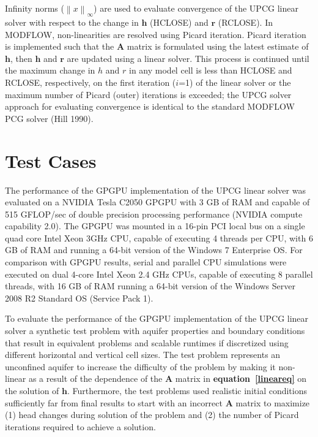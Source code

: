 \documentclass[12pt]{article}
\begin{document}
Infinity norms ($\left \|  x \right \|_{\infty}$) are used to evaluate convergence of the UPCG linear solver with respect to the change in $\mathbf{h}$ (HCLOSE) and $\mathbf{r}$ (RCLOSE). In MODFLOW, non-linearities are resolved using Picard iteration. Picard iteration is implemented such that the $\mathbf{A}$ matrix is formulated using the latest estimate of $\mathbf{h}$, then $\mathbf{h}$ and $\mathbf{r}$ are updated using a linear solver. This process is continued until the maximum change in $h$ and $r$ in any model cell is less than HCLOSE and RCLOSE, respectively, on the first iteration ($i$=1) of the linear solver or the maximum number of Picard (outer) iterations is exceeded; \color{cyan}the UPCG solver approach for evaluating convergence is identical to the standard MODFLOW PCG solver (Hill 1990).\color{black}


\section* {\bf Test Cases}
The performance of the GPGPU implementation of the UPCG linear solver was evaluated on a NVIDIA Tesla C2050 GPGPU with 3 GB of RAM and capable of 515 GFLOP/sec of double precision processing performance (NVIDIA compute capability 2.0). The GPGPU was mounted in a 16-pin PCI local bus on a single quad core Intel \color{cyan}Xeon \color{black}3GHz CPU, capable of executing 4 threads per CPU, with 6 GB of RAM and running a 64-bit version of the Windows 7 Enterprise OS. For comparison with GPGPU results, \color{cyan}serial and \color{black}parallel CPU simulations were executed on dual 4-core Intel \color{cyan}Xeon \color{black}2.4 GHz CPUs, capable of executing 8 parallel threads, with 16 GB of RAM running a 64-bit version of the Windows Server 2008 R2 Standard OS (Service Pack 1).

\color{blue}To evaluate the performance of the GPGPU implementation of the UPCG linear solver a  synthetic test problem with aquifer properties and boundary conditions that result in equivalent problems and scalable runtimes if discretized using different horizontal and vertical cell sizes. The test problem represents an unconfined aquifer to increase the difficulty of the problem by making it non-linear as a result of the dependence of the $\mathbf{A}$ matrix in \textbf{equation~\ref{lineareq}} on the solution of $\mathbf{h}$. Furthermore, the test problems used realistic initial conditions sufficiently far from final results to start with an incorrect $\mathbf{A}$ matrix to maximize (1) head changes during solution of the problem and (2) the number of Picard iterations required to achieve a solution.\color{black}
\end{document}
